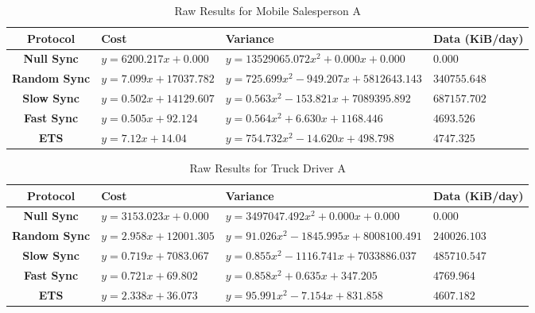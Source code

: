 
\begin{table}[htdp]
\begin{center}
\begin{tabular}{|c|l|l|l|}
\hline
\tiny\textbf{Protocol} &  \tiny\textbf{Cost} & \tiny\textbf{Variance} & \tiny\textbf{Data (KiB/day)} \\
\hline
\tiny\textbf{Null Sync} & \tiny$y=6200.217x+0.000$ & \tiny$y=13529065.072x^2+0.000x+0.000$ & \tiny$0.000$ \\
\hline
\tiny\textbf{Random Sync} & \tiny$y=7.099x+17037.782$ & \tiny$y=725.699x^2-949.207x+5812643.143$ & \tiny$340755.648$ \\
\hline
\tiny\textbf{Slow Sync} & \tiny$y=0.502x+14129.607$ & \tiny$y=0.563x^2-153.821x+7089395.892$ & \tiny$687157.702$ \\
\hline
\tiny\textbf{Fast Sync} & \tiny$y=0.505x+92.124$ & \tiny$y=0.564x^2+6.630x+1168.446$ & \tiny$4693.526$ \\
\hline
\tiny\textbf{ETS} & \tiny$y=7.12x+14.04$ & \tiny$y=754.732x^2-14.620x+498.798$ & \tiny$4747.325$ \\
\hline
\end{tabular}
\end{center}
\caption{Raw Results for Mobile Salesperson A}
\label{sales_a:rawresults}
\end{table}


\begin{table}[htdp]
\begin{center}
\begin{tabular}{|c|l|l|l|}
\hline
\tiny\textbf{Protocol} &  \tiny\textbf{Cost} & \tiny\textbf{Variance} & \tiny\textbf{Data (KiB/day)} \\
\hline
\tiny\textbf{Null Sync} & \tiny$y=3153.023x+0.000$ & \tiny$y=3497047.492x^2+0.000x+0.000$ & \tiny$0.000$ \\
\hline
\tiny\textbf{Random Sync} & \tiny$y=2.958x+12001.305$ & \tiny$y=91.026x^2-1845.995x+8008100.491$ & \tiny$240026.103$ \\
\hline
\tiny\textbf{Slow Sync} & \tiny$y=0.719x+7083.067$ & \tiny$y=0.855x^2-1116.741x+7033886.037$ & \tiny$485710.547$ \\
\hline
\tiny\textbf{Fast Sync} & \tiny$y=0.721x+69.802$ & \tiny$y=0.858x^2+0.635x+347.205$ & \tiny$4769.964$ \\
\hline
\tiny\textbf{ETS} & \tiny$y=2.338x+36.073$ & \tiny$y=95.991x^2-7.154x+831.858$ & \tiny$4607.182$ \\
\hline
\end{tabular}
\end{center}
\caption{Raw Results for Truck Driver A}
\label{trucker_a:rawresults}
\end{table}

